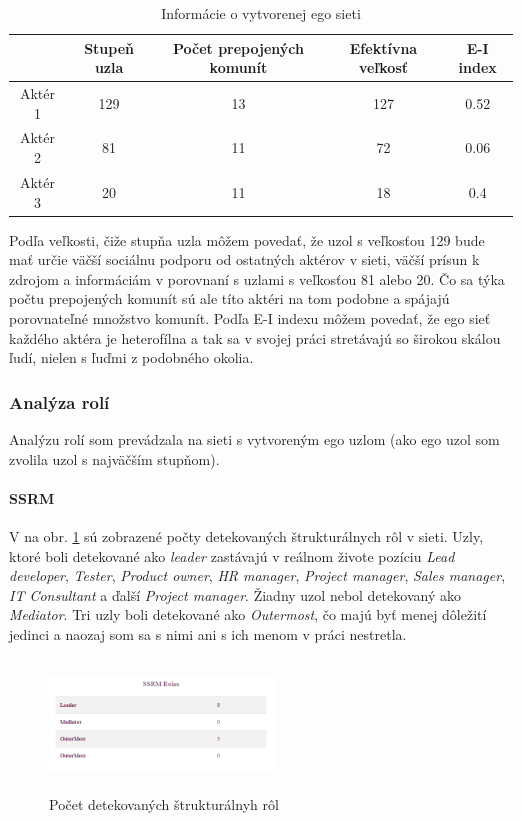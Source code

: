 \documentclass[slovak,master,public,dept460,male,cpdeclaration,oneside]{diploma}
\begin{document}
\begin{table}[h!]
\centering
\begin{tabular}{ |c|c|c|c|c| }
 \hline
  & Stupeň uzla & Počet prepojených komunít & Efektívna veľkosť & E-I index \\ 
 \hline
 Aktér 1    & 129  & 13  & 127  &  0.52 \\  
  \hline
 Aktér 2 &  81  &  11 & 72 & 0.06  \\ 
  \hline
 Aktér 3   & 20   &  11 &  18 & 0.4  \\ 
  \hline

\end{tabular}
\caption{Informácie o vytvorenej ego sieti}
\end{table} 


Podľa veľkosti, čiže stupňa uzla môžem povedať, že uzol s veľkosťou 129 bude mať určie väčší sociálnu podporu od ostatných aktérov v sieti, väčší prísun k zdrojom a informáciám v porovnaní s uzlami s veľkosťou 81 alebo 20. Čo sa týka počtu prepojených komunít sú ale títo aktéri na tom podobne a spájajú porovnateľné množstvo komunít. Podľa E-I indexu môžem povedať, že ego sieť každého aktéra je heterofílna a tak sa v svojej práci stretávajú so širokou skálou ľudí, nielen s ľuďmi z podobného okolia.

\subsubsection{Analýza rolí}

Analýzu rolí som prevádzala na sieti s vytvoreným ego uzlom (ako ego uzol som zvolila uzol s najväčším stupňom). 

\paragraph{SSRM}
\hfill \break
V na obr. \ref{team_ssrm} sú zobrazené počty detekovaných štrukturálnych rôl v sieti. Uzly, ktoré boli detekované ako \textit{leader} zastávajú v reálnom živote pozíciu \textit{Lead developer}, \textit{Tester}, \textit{Product owner}, \textit{HR manager}, \textit{Project manager}, \textit{Sales manager}, \textit{IT Consultant} a ďalší \textit{Project manager}. Žiadny uzol nebol detekovaný ako \textit{Mediator}. Tri uzly boli detekované ako \textit{Outermost}, čo majú byť menej dôležití jedinci a naozaj som sa s nimi ani s ich menom v práci nestretla.

\begin{figure}[H]
\centering
\includegraphics[width=6cm, height=3.5cm]{figures/team_ssrm}
\caption{Počet detekovaných štrukturálnyh rôl}
\label{team_ssrm}
\end{figure}
\end{document}

